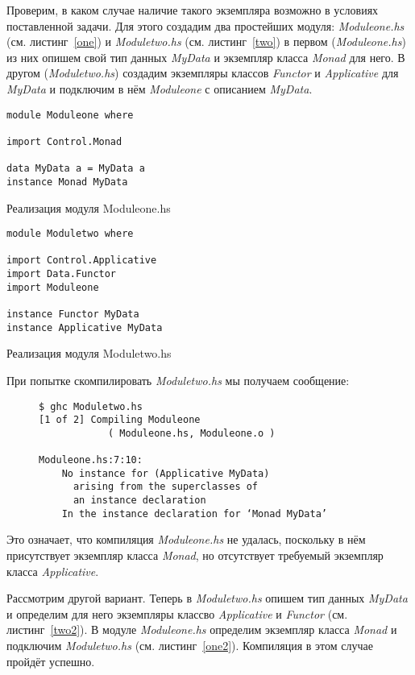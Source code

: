 Проверим, в каком случае наличие такого экземпляра возможно в условиях поставленной задачи. Для этого создадим два простейших модуля: \textit{Moduleone.hs} (см. листинг~\ref{one}) и \textit{Moduletwo.hs} (см. листинг~\ref{two}) в первом (\textit{Moduleone.hs}) из них опишем свой тип данных \textit{MyData} и экземпляр класса \textit{Monad} для него. В другом (\textit{Moduletwo.hs}) создадим экземпляры классов \textit{Functor} и \textit{Applicative} для \textit{MyData} и подключим в нём \textit{Moduleone} с описанием \textit{MyData}.
\begin{ListingEnv}[b]
\begin{lstlisting}
module Moduleone where

import Control.Monad

data MyData a = MyData a
instance Monad MyData
\end{lstlisting}
\caption{Реализация модуля Moduleone.hs}\label{one}
\end{ListingEnv}

\begin{ListingEnv}[h]
\begin{lstlisting}
module Moduletwo where

import Control.Applicative
import Data.Functor
import Moduleone

instance Functor MyData
instance Applicative MyData
\end{lstlisting}
\caption{Реализация модуля Moduletwo.hs}\label{two}
\end{ListingEnv}

При попытке скомпилировать \textit{Moduletwo.hs} мы получаем сообщение:
\begin{figure}[H]
\begin{verbatim}
$ ghc Moduletwo.hs
[1 of 2] Compiling Moduleone  
            ( Moduleone.hs, Moduleone.o )

Moduleone.hs:7:10:
    No instance for (Applicative MyData)
      arising from the superclasses of 
      an instance declaration
    In the instance declaration for ‘Monad MyData’
\end{verbatim}
\end{figure}

Это означает, что компиляция \textit{Moduleone.hs} не удалась, поскольку в нём присутствует экземпляр класса \textit{Monad}, но отсутствует требуемый экземпляр класса \textit{Applicative}.

Рассмотрим другой вариант. Теперь в \textit{Moduletwo.hs} опишем тип данных \textit{MyData} и определим для него экземпляры классво \textit{Applicative} и \textit{Functor} (см. листинг~\ref{two2}). В модуле \textit{Moduleone.hs} определим экземпляр класса \textit{Monad} и подключим \textit{Moduletwo.hs} (см. листинг~\ref{one2}). Компиляция в этом случае пройдёт успешно. 

